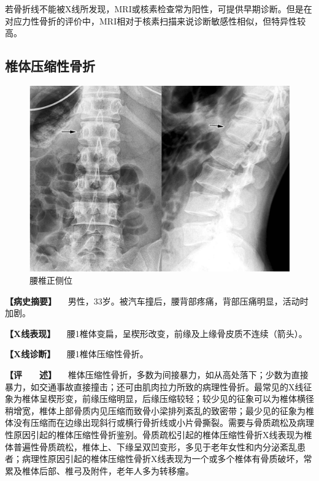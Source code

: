 若骨折线不能被X线所发现，MRI或核素检查常为阳性，可提供早期诊断。但是在对应力性骨折的评价中，MRI相对于核素扫描来说诊断敏感性相似，但特异性较高。

\subsection{椎体压缩性骨折}

\begin{figure}[!htbp]
 \centering
 \includegraphics{./images/Image00059.jpg}
 \captionsetup{justification=centering}
 \caption{腰椎正侧位}
 \label{fig2-3-32}
  \end{figure} 

\textbf{【病史摘要】}
　男性，33岁。被汽车撞后，腰背部疼痛，背部压痛明显，活动时加剧。

\textbf{【X线表现】}
　腰1椎体变扁，呈楔形改变，前缘及上缘骨皮质不连续（箭头）。

\textbf{【X线诊断】} 　腰1椎体压缩性骨折。

\textbf{【评　　述】}
　椎体压缩性骨折，多数为间接暴力，如从高处落下；少数为直接暴力，如交通事故直接撞击；还可由肌肉拉力所致的病理性骨折。最常见的X线征象为椎体呈楔形变，前缘压缩明显，后缘压缩较轻；较少见的征象可以为椎体横径稍增宽，椎体上部骨质内见压缩而致骨小梁排列紊乱的致密带；最少见的征象为椎体没有压缩而在边缘出现斜行或横行骨折线或小片骨撕裂。需要与骨质疏松及病理性原因引起的椎体压缩性骨折鉴别。骨质疏松引起的椎体压缩性骨折X线表现为椎体普遍性骨质疏松，椎体上、下缘呈双凹变形，多见于老年女性和内分泌紊乱患者；病理性原因引起的椎体压缩性骨折X线表现为一个或多个椎体有骨质破坏，常累及椎体后部、椎弓及附件，老年人多为转移瘤。

